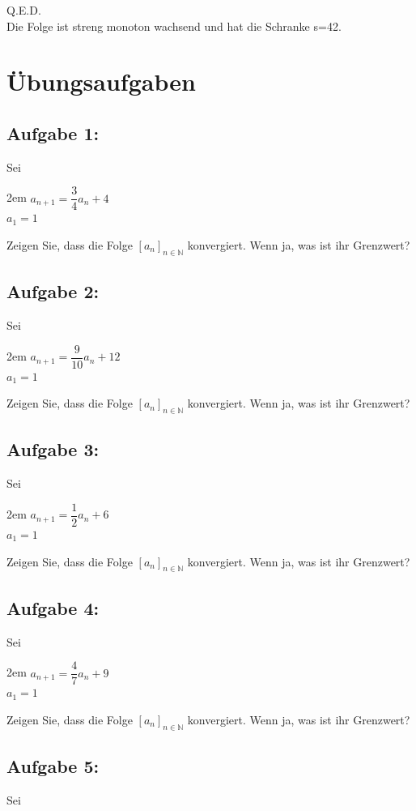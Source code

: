 \documentclass[11pt,final]{scrreprt}
\newcommand{\gbr} {\bigskip\\}
\newcommand{\N} {\mathbb N}
\begin{document}
Q.E.D.\gbr

Die Folge ist streng monoton wachsend und hat die Schranke s=42.\\

\newpage
\section{Übungsaufgaben}

\subsection*{Aufgabe 1:}
Sei

\begingroup
\leftskip2em 
$ a_{n+1} = \dfrac{3}{4} a_n + 4 $\\
$ a_1 = 1 $
\par	
\endgroup 
Zeigen Sie, dass die Folge $ [a_n]_{n\in\N} $ konvergiert. Wenn ja, was ist ihr Grenzwert?

\subsection*{Aufgabe 2:}
Sei

\begingroup
\leftskip2em 
$ a_{n+1} = \dfrac{9}{10} a_n + 12 $\\
$ a_1 = 1 $
\par	
\endgroup 
Zeigen Sie, dass die Folge $ [a_n]_{n\in\N} $ konvergiert. Wenn ja, was ist ihr Grenzwert?

\subsection*{Aufgabe 3:}
Sei

\begingroup
\leftskip2em 
$ a_{n+1} = \dfrac{1}{2} a_n + 6 $\\
$ a_1 = 1 $
\par	
\endgroup 
Zeigen Sie, dass die Folge $ [a_n]_{n\in\N} $ konvergiert. Wenn ja, was ist ihr Grenzwert?

\subsection*{Aufgabe 4:}
Sei

\begingroup
\leftskip2em 
$ a_{n+1} = \dfrac{4}{7} a_n + 9 $\\
$ a_1 = 1 $
\par	
\endgroup 
Zeigen Sie, dass die Folge $ [a_n]_{n\in\N} $ konvergiert. Wenn ja, was ist ihr Grenzwert?

\subsection*{Aufgabe 5:}
Sei
\end{document}
